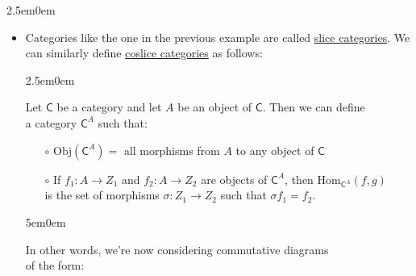 \documentclass{book}
\newcommand{\exP}{%
   \color{VioletRed}%
   \fontsize{12}{14}\selectfont%
}
\newenvironment{myIndent}{%
   \begin{adjustwidth}{2.5em}{0em}%
}{%
   \end{adjustwidth}%
}
\newenvironment{myDindent}{%
   \begin{adjustwidth}{5em}{0em}%
}{%
   \end{adjustwidth}%
}
\newcommand{\myObj}{\mathrm{Obj}}
\newcommand{\myHom}{\mathrm{Hom}}
\newcommand{\mcateg}[1]{\mathsf{#1}}
\newcommand{\retTwo}{\hfill\bigbreak}
\begin{document}
\begin{myIndent}
\begin{itemize}
         \item Categories like the one in the previous example are called \ul{slice categories}. We\\ can similarly define \ul{coslice categories} as follows:
         \begin{myIndent}
            Let $\mcateg{C}$ be a category and let $A$ be an object of $\mcateg{C}$. Then we can define\\ a category $\mcateg{C}^A$ such that:
            \begin{itemize}
               \item[$\circ$] $\myObj(\mcateg{C}^A) =$ all morphisms from $A$ to any object of $\mcateg{C}$
               \item[$\circ$] If $f_1: A \longrightarrow Z_1$ and $f_2: A \longrightarrow Z_2$ are objects of $\mcateg{C}^A$, then $\myHom_{\mcateg{C}^A}(f, g)$\\ is the set of morphisms $\sigma: Z_1 \rightarrow Z_2$ such that $\sigma f_1 = f_2$.
            \end{itemize}
            {\begin{myDindent}\exP
               In other words, we're now considering commutative diagrams\\ of the form:
               
               \begin{center}
               \end{center}

            \end{myDindent}}
         \end{myIndent}
      \end{itemize}
   \end{myIndent}\retTwo
\end{document}
